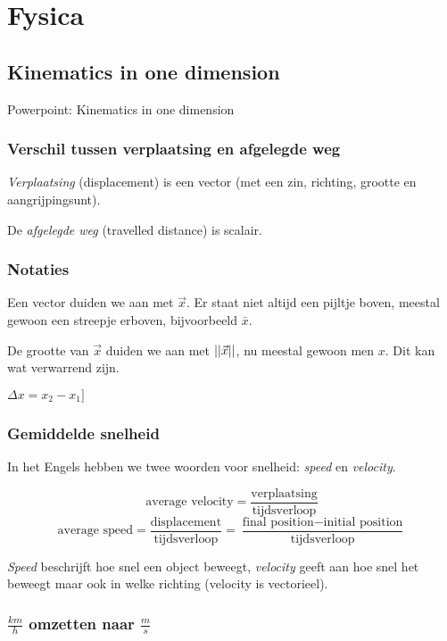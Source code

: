 \chapter{Fysica}

\section{Kinematics in one dimension}

Powerpoint: Kinematics in one dimension

\subsection{Verschil tussen verplaatsing en afgelegde weg}

\emph{Verplaatsing} (displacement) is een vector (met een zin, richting, grootte en aangrijpingsunt).

De \emph{afgelegde weg} (travelled distance) is scalair.

\subsection{Notaties}

Een vector duiden we aan met \(\vec{x}\). Er staat niet altijd een pijltje boven, meestal gewoon een streepje erboven, bijvoorbeeld \(\bar{x}\).

De grootte van \(\vec{x}\) duiden we aan met \(\lvert \lvert  \vec{x}  \rvert \rvert\), nu meestal gewoon men \(x\). Dit kan wat verwarrend zijn.

\( \Delta x = x_{2} - x_{1}] \)

\subsection{Gemiddelde snelheid}

In het Engels hebben we twee woorden voor snelheid: \emph{speed} en \emph{velocity}.

\[ \textrm{average velocity} = \frac{ \textrm{verplaatsing}}{ \textrm{tijdsverloop}}\]
\[ \textrm{average speed} = \frac{ \textrm{displacement}}{\textrm{tijdsverloop}} = \frac{\textrm{final position} - \textrm{initial position}}{\textrm{tijdsverloop}} \]

\emph{Speed} beschrijft hoe snel een object beweegt, \emph{velocity} geeft aan hoe snel het beweegt maar ook in welke richting (velocity is vectorieel).

\subsection{\(\frac{km}{h}\) omzetten naar \(\frac{m}{s}\)}

